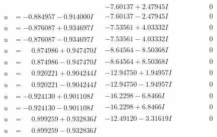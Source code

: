 \documentclass[1p]{elsarticle_modified}
\theoremstyle{definition}
\begin{document}
$$\begin{array}{c|c|c}
 & -7.60137 + 2.47945 I & \phantom{-0.000000 } 0 \\ \hline\begin{aligned}
u &= -0.884957 - 0.914000 I\end{aligned}
 & -7.60137 - 2.47945 I & \phantom{-0.000000 } 0 \\ \hline\begin{aligned}
u &= -0.876087 + 0.934697 I\end{aligned}
 & -7.53561 + 4.03332 I & \phantom{-0.000000 } 0 \\ \hline\begin{aligned}
u &= -0.876087 - 0.934697 I\end{aligned}
 & -7.53561 - 4.03332 I & \phantom{-0.000000 } 0 \\ \hline\begin{aligned}
u &= \phantom{-}0.874986 + 0.947470 I\end{aligned}
 & -8.64564 - 8.50368 I & \phantom{-0.000000 } 0 \\ \hline\begin{aligned}
u &= \phantom{-}0.874986 - 0.947470 I\end{aligned}
 & -8.64564 + 8.50368 I & \phantom{-0.000000 } 0 \\ \hline\begin{aligned}
u &= \phantom{-}0.920221 + 0.904244 I\end{aligned}
 & -12.94750 + 1.94957 I & \phantom{-0.000000 } 0 \\ \hline\begin{aligned}
u &= \phantom{-}0.920221 - 0.904244 I\end{aligned}
 & -12.94750 - 1.94957 I & \phantom{-0.000000 } 0 \\ \hline\begin{aligned}
u &= -0.924130 + 0.901108 I\end{aligned}
 & -16.2298 - 6.8466 I & \phantom{-0.000000 } 0 \\ \hline\begin{aligned}
u &= -0.924130 - 0.901108 I\end{aligned}
 & -16.2298 + 6.8466 I & \phantom{-0.000000 } 0 \\ \hline\begin{aligned}
u &= \phantom{-}0.899259 + 0.932836 I\end{aligned}
 & -12.49120 - 3.31619 I & \phantom{-0.000000 } 0 \\ \hline\begin{aligned}
u &= \phantom{-}0.899259 - 0.932836 I\end{aligned}

\end{array}$$
\end{document}

